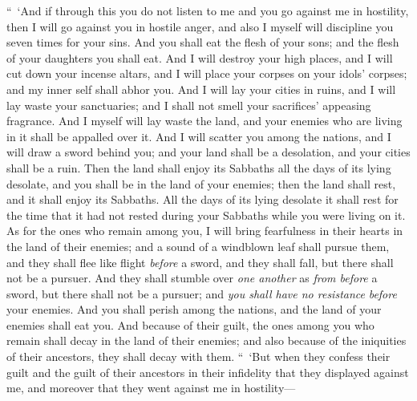 \begin{biblechapter}
\verse “ ‘And if through this you do not listen to me and you go against me in hostility,
\verse then I will go against you in hostile anger, and also I myself will discipline you seven times for your sins.
\verse And you shall eat the flesh of your sons; and the flesh of your daughters you shall eat.
\verse And I will destroy your high places, and I will cut down your incense altars, and I will place your corpses on your idols’ corpses; and my inner self shall abhor you.
\verse And I will lay your cities in ruins, and I will lay waste your sanctuaries; and I shall not smell your sacrifices’ appeasing fragrance.
\verse And I myself will lay waste the land, and your enemies who are living in it shall be appalled over it.
\verse And I will scatter you among the nations, and I will draw a sword behind you; and your land shall be a desolation, and your cities shall be a ruin.
\verse Then the land shall enjoy its Sabbaths all the days of its lying desolate, and you shall be in the land of your enemies; then the land shall rest, and it shall enjoy its Sabbaths.
\verse All the days of its lying desolate it shall rest for the time that it had not rested during your Sabbaths while you were living on it.
\verse As for the ones who remain among you, I will bring fearfulness in their hearts in the land of their enemies; and a sound of a windblown leaf shall pursue them, and they shall flee like flight \textit{before} a sword, and they shall fall, but there shall not be a pursuer.
\verse And they shall stumble over \textit{one another} as \textit{from before} a sword, but there shall not be a pursuer; and \textit{you shall have no resistance} \textit{before} your enemies.
\verse And you shall perish among the nations, and the land of your enemies shall eat you.
\verse And because of their guilt, the ones among you who remain shall decay in the land of their enemies; and also because of the iniquities of their ancestors, they shall decay with them.
\verse “ ‘But when they confess their guilt and the guilt of their ancestors in their infidelity that they displayed against me, and moreover that they went against me in hostility—

\end{biblechapter}
